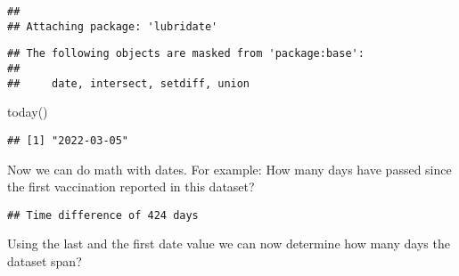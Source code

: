 \documentclass[
]{article}
\newenvironment{Shaded}{\begin{snugshade}}{\end{snugshade}}
\newcommand{\DecValTok}[1]{\textcolor[rgb]{0.00,0.00,0.81}{#1}}
\newcommand{\FunctionTok}[1]{\textcolor[rgb]{0.00,0.00,0.00}{#1}}
\newcommand{\NormalTok}[1]{#1}
\newcommand{\OtherTok}[1]{\textcolor[rgb]{0.56,0.35,0.01}{#1}}
\newcommand{\SpecialCharTok}[1]{\textcolor[rgb]{0.00,0.00,0.00}{#1}}
\begin{document}
\begin{verbatim}
## 
## Attaching package: 'lubridate'
\end{verbatim}

\begin{verbatim}
## The following objects are masked from 'package:base':
## 
##     date, intersect, setdiff, union
\end{verbatim}

\begin{Shaded}
\begin{Highlighting}[]
\FunctionTok{today}\NormalTok{()}
\end{Highlighting}
\end{Shaded}

\begin{verbatim}
## [1] "2022-03-05"
\end{verbatim}

\begin{Shaded}
\end{Shaded}

Now we can do math with dates. For example: How many days have passed
since the first vaccination reported in this dataset?

\begin{Shaded}
\end{Shaded}

\begin{verbatim}
## Time difference of 424 days
\end{verbatim}

Using the last and the first date value we can now determine how many
days the dataset span?

\begin{Shaded}
\end{Shaded}
\end{document}
